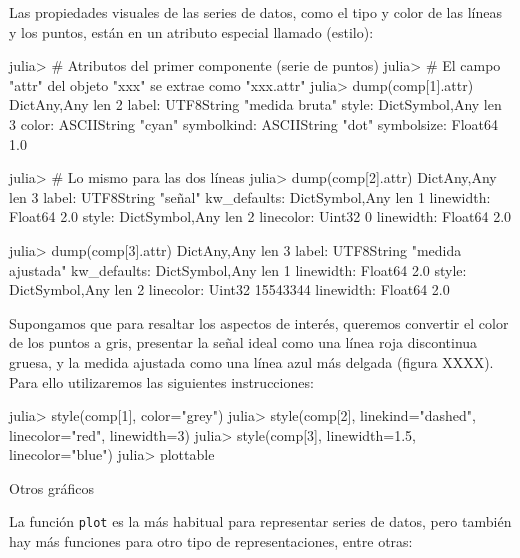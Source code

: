 ﻿\documentclass{article}
\newcommand{\code}{\texttt}
\begin{document}
Las propiedades visuales de las series de datos, como el tipo y color de las líneas y los puntos, están en un atributo especial llamado  (estilo):

julia> # Atributos del primer componente (serie de puntos)
julia> # El campo "attr" del objeto "xxx" se extrae como "xxx.attr"
julia> dump(comp[1].attr)
Dict{Any,Any} len 2
  label: UTF8String "medida bruta"
  style: Dict{Symbol,Any} len 3
    color: ASCIIString "cyan"
    symbolkind: ASCIIString "dot"
    symbolsize: Float64 1.0

julia> # Lo mismo para las dos líneas
julia> dump(comp[2].attr)
Dict{Any,Any} len 3
  label: UTF8String "señal"
  kw_defaults: Dict{Symbol,Any} len 1
    linewidth: Float64 2.0
  style: Dict{Symbol,Any} len 2
    linecolor: Uint32 0
    linewidth: Float64 2.0

julia> dump(comp[3].attr)
Dict{Any,Any} len 3
  label: UTF8String "medida ajustada"
  kw_defaults: Dict{Symbol,Any} len 1
    linewidth: Float64 2.0
  style: Dict{Symbol,Any} len 2
    linecolor: Uint32 15543344
    linewidth: Float64 2.0

Supongamos que para resaltar los aspectos de interés, queremos convertir el color de los puntos a gris, presentar la señal ideal como una línea roja discontinua gruesa, y la medida ajustada como una línea azul más delgada (figura XXXX). Para ello utilizaremos las siguientes instrucciones:

julia> style(comp[1], color="grey")
julia> style(comp[2], linekind="dashed", linecolor="red", linewidth=3)
julia> style(comp[3], linewidth=1.5, linecolor="blue")
julia> plottable

Otros gráficos

La función \code{plot} es la más habitual para representar series de datos, pero también hay más funciones para otro tipo de representaciones, entre otras:
\end{document}

